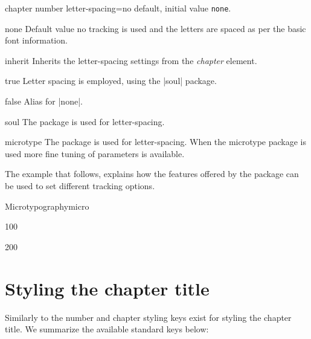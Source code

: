 \begin{docKey}[phd]{chapter number letter-spacing}{=}{no default, initial value \texttt{none}}.
\end{docKey}

\begin{marglist}
\item[none] Default value no tracking is used and the letters are spaced as per the basic font information.
\item[inherit] Inherits the letter-spacing settings from the \emph{chapter} element.
\item[true] Letter spacing is employed, using the |soul| package.
\item[false] Alias for |none|.
\item[soul] The  package is used for letter-spacing.
\item[microtype] The  package is used for letter-spacing. When the microtype package is used more fine tuning of parameters is available.
\end{marglist}

The example that follows, explains how the features offered by the  package can be used to
set different tracking options.

\begin{texexample}{Microtypography}{micro}
\bgroup

 { 100 }

{\huge {}}

 { 200 }
 
{\huge {}}

\egroup
\end{texexample}


\hbox{}

\hbox{}


\section{Styling the chapter title}

Similarly to the number and chapter styling keys exist for styling the chapter title. We summarize the available standard keys below:


